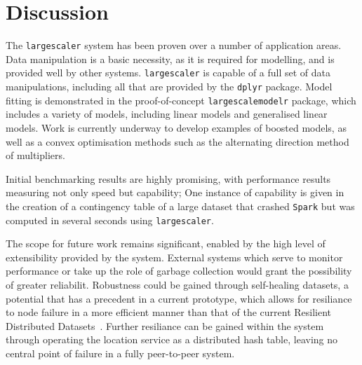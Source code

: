 \section{Discussion}

The \texttt{largescaler} system has been proven over a number of application areas.
Data manipulation is a basic necessity, as it is required for modelling, and is provided well by other systems.
\texttt{largescaler} is capable of a full set of data manipulations, including all that are provided by the \texttt{dplyr} package.
Model fitting is demonstrated in the proof-of-concept \texttt{largescalemodelr} package, which includes a variety of models, including linear models and generalised linear models.
Work is currently underway to develop examples of boosted models, as well as a convex optimisation methods such as the alternating direction method of multipliers.

Initial benchmarking results are highly promising, with performance results measuring not only speed but capability;
One instance of capability is given in the creation of a contingency table of a large dataset that crashed \texttt{Spark} but was computed in several seconds using \texttt{largescaler}.

The scope for future work remains significant, enabled by the high level of extensibility provided by the system.
External systems which serve to monitor performance or take up the role of garbage collection would grant the possibility of greater reliabilit.
Robustness could be gained through self-healing datasets, a potential that has a precedent in a current prototype, which allows for resiliance to node failure in a more efficient manner than that of the current Resilient Distributed Datasets~\cite{zaharia2012resilient}.
Further resiliance can be gained within the system through operating the location service as a distributed hash table, leaving no central point of failure in a fully peer-to-peer system.